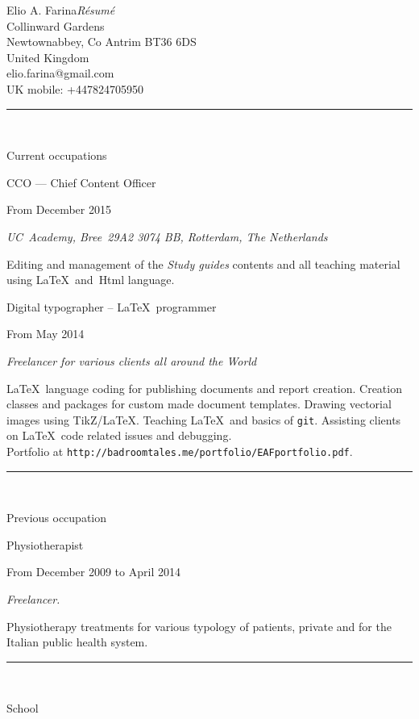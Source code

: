 \documentclass{article}
\newcommand{\titolo}[1]{\bgroup\rule{\linewidth}{1pt}\\[-14pt]
    \null\hfill\fontsize{10pt}{12pt}\sc\selectfont\strut#1\\[7pt]\egroup}
\newcommand{\lavorofisio}[5]{%
    {\fontsize{14pt}{17pt}\selectfont\strut#1}\hfill\strut#2\\[-7pt]
    \begin{adjustwidth}{28pt}{28pt}
    \fontsize{10pt}{12pt}\selectfont\strut\textit{#3}\\[2pt]
    \fontsize{10pt}{12pt}\selectfont\strut#4\\[10pt]
    \end{adjustwidth}}
\newcommand{\paragrafo}[1]{{\fontsize{10pt}{12pt}\selectfont#1}\\[7pt]}
\newcommand{\diploma}[4]{{\fontsize{14pt}{17pt}\selectfont#1}\hfill#2\\
    \begin{adjustwidth}{28pt}{28pt}
    \it #3\\
    \end{adjustwidth}}
\newcommand{\universita}[4]{{\fontsize{14pt}{17pt}\selectfont#1}\hfill#2\\
    \begin{adjustwidth}{28pt}{28pt}
    \textit{#3}\\
    #4\\[14pt]
    \end{adjustwidth}}
\begin{document}
\raggedright\pagestyle{empty}
\\
elio.farina@gmail.com\\
UK mobile: +447824705950\\
\egroup

\vfill
\titolo{Current occupations}

\lavorofisio{{CCO} --- Chief Content Officer}{From December 2015}{UC~Academy, Bree~29A2 3074 BB, Rotterdam, The Netherlands}{Editing and management of the \textit{Study guides} contents and all teaching material using \LaTeX\ and~{\sc Html} language.}{}

\vspace{20pt}
\lavorofisio{Digital typographer -- \LaTeX\ programmer}{From May 2014}{Freelancer for various clients all around the World}{\LaTeX\ language coding for publishing documents and report creation. Creation classes and packages for custom made document templates. Drawing vectorial images using TikZ/\LaTeX. Teaching \LaTeX\ and basics of \texttt{git}. Assisting clients on \LaTeX\ code related issues and debugging.\\
Portfolio at \texttt{http://badroomtales.me/portfolio/EAFportfolio.pdf}.}{}

\vfill
\titolo{Previous occupation}
\lavorofisio{Physiotherapist}{From December 2009 to April 2014}{Freelancer.}{Physiotherapy treatments for various typology of patients, private and for the Italian public health system.}

\vfill
\titolo{School}


\end{document}
